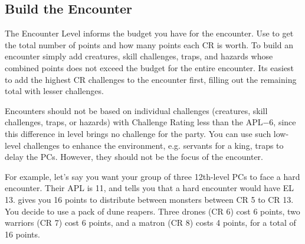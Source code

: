 
\subsection{Build the Encounter}
The Encounter Level informs the budget you have for the encounter. Use  to get the total number of points and how many points each CR is worth. To build an encounter simply add creatures, skill challenges, traps, and hazards whose combined points does not exceed the budget for the entire encounter. Its easiest to add the highest CR challenges to the encounter first, filling out the remaining total with lesser challenges.

Encounters should not be based on individual challenges (creatures, skill challenges, traps, or hazards) with Challenge Rating less than the APL$-6$, since this difference in level brings no challenge for the party. You can use such low-level challenges to enhance the environment, e.g. servants for a king, traps to delay the PCs. However, they should not be the focus of the encounter.


For example, let's say you want your group of three 12th-level PCs to face a hard encounter. Their APL is 11, and  tells you that a hard encounter would have EL 13.  gives you 16 points to distribute between monsters between CR 5 to CR 13. You decide to use a pack of dune reapers. Three drones (CR 6) cost 6 points, two warriors (CR 7) cost 6 points, and a matron (CR 8) costs 4 points, for a total of 16 points.

